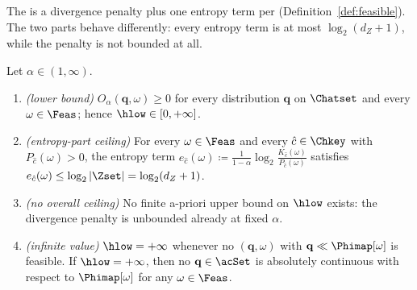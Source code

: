 
The  is a divergence penalty plus one entropy term per
 (Definition~\ref{def:feasible}). The two parts
behave differently: every entropy term is at most $\log_2(d_Z+1)$, while the
penalty is not bounded at all.

\begin{proposition}\label{prop:value-range}
Let $\alpha\in(1,\infty)$.
\begin{enumerate}[label=(\roman*),leftmargin=2.2em]
\item \emph{(lower bound)} $O_{\alpha}(\mathbf q,\omega)\ge0$ for every
distribution $\mathbf q$ on $\Chatset$ and every $\omega\in\Feas$; hence
$\hlow\in[0,+\infty]$.
\item \emph{(entropy-part ceiling)} For every $\omega\in\Feas$ and every
$\hat c\in\Chkey$ with $P_{\hat c}(\omega)>0$, the entropy term
$e_{\hat c}(\omega)\coloneqq\frac{1}{1-\alpha}
\log_2\frac{K_{\hat c}(\omega)}{P_{\hat c}(\omega)}$ satisfies
$e_{\hat c}(\omega)\le\log_2|\Zset|=\log_2(d_Z+1)$.
\item \emph{(no overall ceiling)} No finite a-priori upper bound on $\hlow$
exists: the divergence penalty is unbounded already at fixed $\alpha$.
\item \emph{(infinite value)} $\hlow=+\infty$ whenever no
$(\mathbf q,\omega)$ with $\mathbf q\ll\Phimap[\omega]$ is feasible. If
$\hlow=+\infty$, then no $\mathbf q\in\acSet$ is absolutely continuous with
respect to $\Phimap[\omega]$ for any $\omega\in\Feas$.
\end{enumerate}
\end{proposition}

